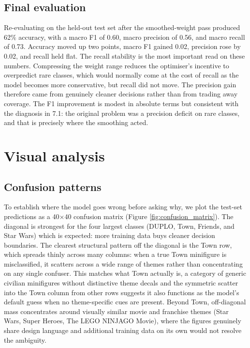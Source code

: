 \subsection{Final evaluation}
Re-evaluating on the held-out test set after the smoothed-weight pass produced 62\% accuracy, with a macro F1 of 0.60, macro precision of 0.56, and macro recall of 0.73. Accuracy moved up two points, macro F1 gained 0.02, precision rose by 0.02, and recall held flat.
The recall stability is the most important read on these numbers. Compressing the weight range reduces the optimiser's incentive to overpredict rare classes, which would normally come at the cost of recall as the model becomes more conservative, but recall did not move. The precision gain therefore came from genuinely cleaner decisions rather than from trading away coverage. The F1 improvement is modest in absolute terms but consistent with the diagnosis in 7.1: the original problem was a precision deficit on rare classes, and that is precisely where the smoothing acted.

\section{Visual analysis}
\subsection{Confusion patterns}
To establish where the model goes wrong before asking why, we plot the test-set predictions as a 40$\times$40 confusion matrix (Figure \ref{fig:confusion_matrix}). The diagonal is strongest for the four largest classes (DUPLO, Town, Friends, and Star Wars) which is expected: more training data buys cleaner decision boundaries. 
The clearest structural pattern off the diagonal is the Town row, which spreads thinly across many columns: when a true Town minifigure is misclassified, it scatters across a wide range of themes rather than concentrating on any single confuser. This matches what Town actually is, a category of generic civilian minifigures without distinctive theme decals and the symmetric scatter into the Town column from other rows suggests it also functions as the model's default guess when no theme-specific cues are present. Beyond Town, off-diagonal mass concentrates around visually similar movie and franchise themes (Star Wars, Super Heroes, The LEGO NINJAGO Movie), where the figures genuinely share design language and additional training data on its own would not resolve the ambiguity. 

